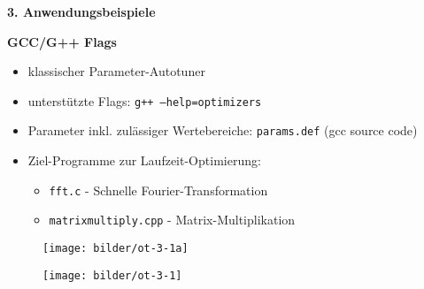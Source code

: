     \begingroup
    \begin{frame}
      \textbf{3. Anwendungsbeispiele} \newline
      
    \textbf{GCC/G++ Flags}
      \begin{itemize}
        \item klassischer Parameter-Autotuner
        \item unterstützte Flags: \texttt{g++ --help=optimizers}
        \item Parameter inkl. zulässiger Wertebereiche: \texttt{params.def} (gcc source code)
        
        
        \item Ziel-Programme zur Laufzeit-Optimierung:
        \begin{itemize}
          \item \texttt{fft.c} - Schnelle Fourier-Transformation
          \item \texttt{matrixmultiply.cpp} - Matrix-Multiplikation
        \end{itemize}        
      \end{itemize}
    \end{frame}
    \endgroup
        
    \begingroup
  \begin{frame}
    \begin{figure}[ht]
      \centering	      
      \texttt{[image: bilder/ot-3-1a]}
      \label{gccpy1a}
    \end{figure}
  \end{frame}
  \endgroup
  
  \begingroup
  \begin{frame}
    \begin{figure}[ht]
      \centering	      
      \texttt{[image: bilder/ot-3-1]}
      \label{gccpy1}
    \end{figure}
  \end{frame}
\endgroup
  
